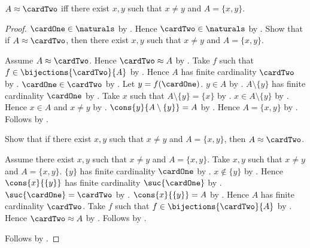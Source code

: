 \begin{theorem}\label{two_element_cardinality_characterization}
    $A\approx\cardTwo$ iff there exist $x,y$ such that
        $x\neq y$ and $A=\{x,y\}$.
\end{theorem}
\begin{proof}
    $\cardOne\in\naturals$ by
        .
    Hence $\cardTwo\in\naturals$ by
        .
    Show that if $A\approx\cardTwo$, then there exist $x,y$ such that
        $x\neq y$ and $A=\{x,y\}$.
    \begin{subproof}
        Assume $A\approx\cardTwo$.
        Hence $\cardTwo\approx A$ by .
        Take $f$ such that $f\in\bijections{\cardTwo}{A}$ by
            .
        Hence $A$ has finite cardinality $\cardTwo$ by
            .
        $\cardOne\in\cardTwo$
            by .
        Let $y=f(\cardOne)$.
        $y\in A$ by .
        $A\setminus\{y\}$ has finite cardinality $\cardOne$ by
            .
        Take $x$ such that $A\setminus\{y\}=\{x\}$ by
            .
        $x\in A\setminus\{y\}$ by .
        Hence $x\in A$ and $x\neq y$ by
            .
        $\cons{y}{A\setminus\{y\}}=A$ by .
        Hence $A=\{x,y\}$ by
            .
        Follows by \auto.
    \end{subproof}
    Show that if there exist $x,y$ such that $x\neq y$ and
            $A=\{x,y\}$, then $A\approx\cardTwo$.
    \begin{subproof}
        Assume there exist $x,y$ such that $x\neq y$ and $A=\{x,y\}$.
        Take $x,y$ such that $x\neq y$ and $A=\{x,y\}$.
        $\{y\}$ has finite cardinality $\cardOne$ by
            .
        $x\notin\{y\}$ by .
        Hence $\cons{x}{\{y\}}$ has finite cardinality
            $\suc{\cardOne}$ by .
        $\suc{\cardOne}=\cardTwo$ by .
        $\cons{x}{\{y\}}=A$ by
            .
        Hence $A$ has finite cardinality $\cardTwo$.
        Take $f$ such that $f\in\bijections{\cardTwo}{A}$ by
            .
        Hence $\cardTwo\approx A$ by .
        Follows by .
    \end{subproof}
    Follows by \auto.
\end{proof}

